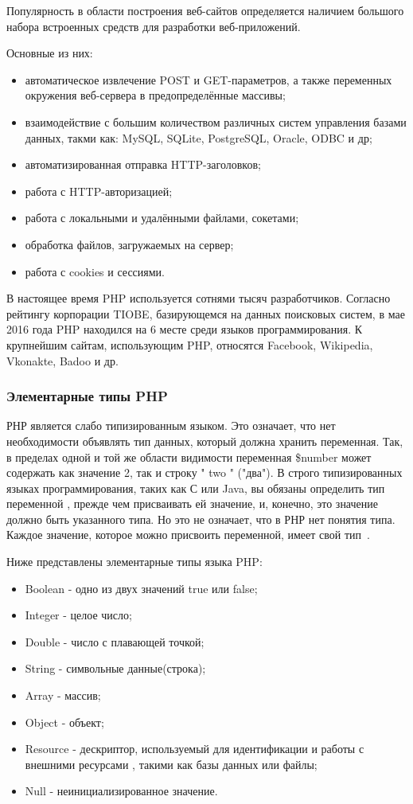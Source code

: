 Популярность в области построения веб-сайтов определяется наличием большого набора встроенных средств для разработки веб-приложений. 

Основные из них:
\begin{itemize}
  \item автоматическое извлечение POST и GET-параметров, а также переменных окружения веб-сервера в предопределённые массивы;
  \item взаимодействие с большим количеством различных систем управления базами данных, такми как: MySQL,  SQLite, PostgreSQL, Oracle, ODBC и др;
  \item автоматизированная отправка HTTP-заголовков;
  \item работа с HTTP-авторизацией;
  \item работа с локальными и удалёнными файлами, сокетами;
  \item обработка файлов, загружаемых на сервер;
  \item работа с cookies и сессиями.
\end{itemize}

В настоящее время PHP используется сотнями тысяч разработчиков. Согласно рейтингу корпорации TIOBE, базирующемся на данных поисковых систем, в мае 2016 года PHP находился на 6 месте среди языков программирования. К крупнейшим сайтам, использующим PHP, относятся Facebook, Wikipedia, Vkonakte, Badoo и др.



\subsubsection{Элементарные типы PHP }
\label{sub:practice:types_php}

РНР является слабо типизированным языком. Это означает, что нет необходимости объявлять тип данных, который должна хранить переменная. Так, в пределах одной и той же области видимости переменная \$number может содержать как значение 2, так и строку " two " ("два"). В строго типизированных языках программирования, таких как С или Java, вы обязаны определить тип переменной , прежде чем присваивать ей значение, и, конечно, это значение должно быть указанного типа. Но это не означает, что в РНР нет понятия типа. Каждое значение, которое можно присвоить переменной, имеет свой тип~\cite{zandstra_2015}.

Ниже представлены элементарные типы языка PHP:
\begin{itemize}
  \item Boolean - одно из двух значений true или false;
  \item Integer - целое число;
  \item Double - число с плавающей точкой;
  \item String - символьные данные(строка);
  \item Array - массив;
  \item Object - объект;
  \item Resource - дескриптор, используемый для идентификации и работы с внешними ресурсами , такими как базы данных или файлы; 
  \item Null - неинициализированное значение.
\end{itemize}


